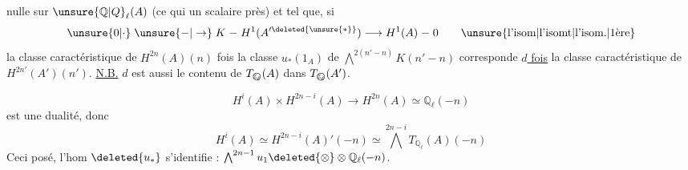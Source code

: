 nulle sur $\unsure{\mathbb Q|Q}_\ell(A)$ (ce qui    un scalaire près) et tel que, si
\[
 \unsure{0|\cdot}\mathrel{\unsure{-|\to}}K\mathrel{-}H^1(A'^{\deleted{\unsure{*}}})\longrightarrow H^1(A)\mathrel{-}0
 \qquad\text{\unsure{l'isom|l'isomt|l'isom.|1ère}}
\]
 la classe caractéristique de $H^{2n}(A)(n)$ fois la classe  $u_*(1_A)$ de $\bigwedge^{2(n'-n)}K(n'-n)$ corresponde \uline{$d$ fois} la classe caractéristique de $H^{2n'}(A')(n')$. \uline{N.B.} $d$ est aussi le
contenu de $T_{\text{\textcircled{$\scriptstyle\mathbb Z_\ell$}}}(A)$ dans $T_{\text{\textcircled{$\scriptstyle\mathbb Z_\ell$}}}(A')$.

\[
 H^i(A)\times H^{2n-i}(A)\longrightarrow H^{2n}(A)\simeq\mathbb Q_\ell(-n)
\]
est une dualité, donc
\[
 H^i(A)\simeq H^{2n-i}(A)'(-n)\simeq\bigwedge^{2n-i}T_{\mathbb Q_\ell}(A)(-n)
\]
 Ceci posé, l'hom $\deleted{u_*}$
s'identifie : $\bigwedge^{2n-1}u_1\deleted{\otimes}\otimes\mathbb Q_\ell(-n)$.

